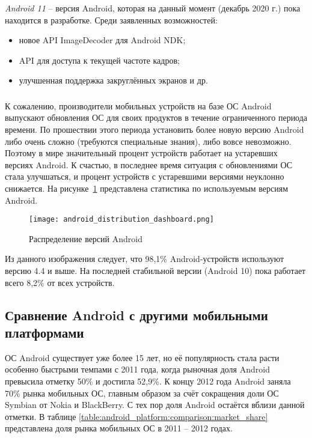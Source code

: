 \textit{Android 11} -- версия Android, которая на данный момент (декабрь 2020 г.) пока находится в разработке.
Среди заявленных возможностей:
\begin{itemize}
	\item новое API ImageDecoder для Android NDK;
	\item API для доступа к текущей частоте кадров;
	\item улучшенная поддержка закруглённых экранов и др. \cite{android_11}
\end{itemize}

\subsubsection*{}
\label{subsub:android_platform:history:distribution}

К сожалению, производители мобильных устройств на базе ОС Android выпускают обновления ОС для своих продуктов в течение ограниченного периода времени.
По прошествии этого периода установить более новую версию Android либо очень сложно (требуются специальные знания), либо вовсе невозможно.
Поэтому в мире значительный процент устройств работает на устаревших версиях Android.
К счастью, в последнее время ситуация с обновлениями ОС стала улучшаться, и процент устройств с устаревшими версиями неуклонно снижается.
На рисунке~\ref{fig:android_distribution_dashboard} представлена статистика по используемым версиям Android. \cite{android_about_dashboards}

\begin{figure}[ht]
    \centering
    \texttt{[image: android\_distribution\_dashboard.png]}
	\caption{Распределение версий Android}
	\label{fig:android_distribution_dashboard}
\end{figure}

Из данного изображения следует, что 98,1\% Android-устройств используют версию 4.4 и выше.
На последней стабильной версии (Android 10) пока работает всего 8,2\% от всех устройств.

\subsection{Сравнение Android с другими мобильными платформами} \label{sub:android_platform:comparison}

ОС Android существует уже более 15 лет, но её популярность стала расти особенно быстрыми темпами с 2011 года, когда рыночная доля Android превысила отметку 50\% и достигла 52,9\%.
К концу 2012 года Android заняла 70\% рынка мобильных ОС, главным образом за счёт сокращения доли ОС Symbian от Nokia и BlackBerry.
С тех пор доля Android остаётся вблизи данной отметки.
В таблице \ref{table:android_platform:comparison:market_share} представлена доля рынка мобильных ОС в 2011 -- 2012 годах. \cite{comparative_study_of_mobile_oses_2016}

